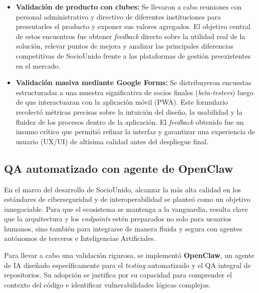 \documentclass[conference, a4paper]{IEEEtran}
\begin{document}
\begin{itemize}
    \item \textbf{Validaci\'on de producto con clubes:} Se llevaron a cabo reuniones con personal administrativo y directivo de diferentes instituciones para presentarles el producto y exponer sus valores agregados. El objetivo central de estos encuentros fue obtener \textit{feedback} directo sobre la utilidad real de la soluci\'on, relevar puntos de mejora y analizar las principales diferencias competitivas de SocioUnido frente a las plataformas de gesti\'on preexistentes en el mercado.
    \item \textbf{Validaci\'on masiva mediante Google Forms:} Se distribuyeron encuestas estructuradas a una muestra significativa de socios finales (\textit{beta-testers}) luego de que interactuaran con la aplicaci\'on m\'ovil (PWA). Este formulario recolect\'o m\'etricas precisas sobre la intuici\'on del dise\~no, la usabilidad y la fluidez de los procesos dentro de la aplicaci\'on. El \textit{feedback} obtenido fue un insumo cr\'itico que permiti\'o refinar la interfaz y garantizar una experiencia de usuario (UX/UI) de alt\'isima calidad antes del despliegue final.
\end{itemize}

\subsection{QA automatizado con agente de OpenClaw}
En el marco del desarrollo de SocioUnido, alcanzar la m\'as alta calidad en los est\'andares de ciberseguridad y de interoperabilidad se plante\'o como un objetivo innegociable. Para que el ecosistema se mantenga a la vanguardia, resulta clave que la arquitectura y los \textit{endpoints} est\'en preparados no solo para usuarios humanos, sino tambi\'en para integrarse de manera fluida y segura con agentes aut\'onomos de terceros e Inteligencias Artificiales.

Para llevar a cabo una validaci\'on rigurosa, se implement\'o \textbf{OpenClaw}, un agente de IA dise\~nado espec\'ificamente para el \textit{testing} automatizado y el QA integral de repositorios. Su adopci\'on se justifica por su capacidad para comprender el contexto del c\'odigo e identificar vulnerabilidades l\'ogicas complejas.
\end{document}
